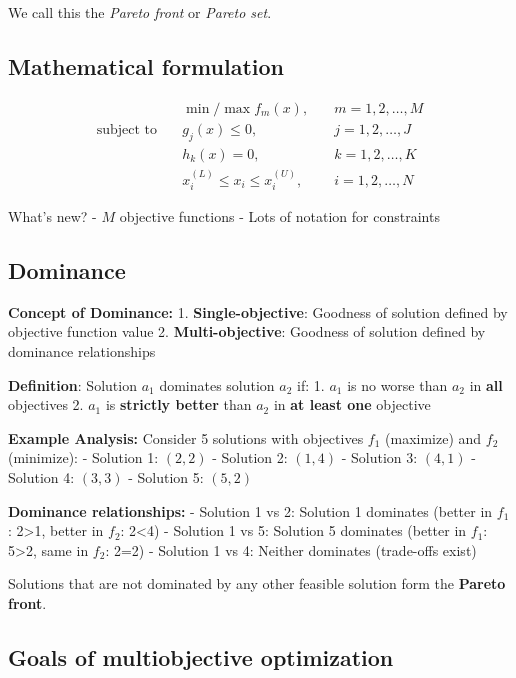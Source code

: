 \documentclass[
  letterpaper,
  DIV=11,
  numbers=noendperiod]{scrreprt}
\begin{document}
We call this the \emph{Pareto front} or \emph{Pareto set}.

\subsection{Mathematical formulation}\label{mathematical-formulation}

\[
\begin{align}
& \min / \max f_m(x), & \quad m = 1, 2, \ldots, M \\
\text{subject to} \quad &g_j(x) \leq 0, &\quad  j = 1, 2, \ldots, J \\
 &h_k(x) = 0, &\quad  k = 1, 2, \ldots, K \\
 &x_i^{(L)} \leq x_i \leq x_i^{(U)}, &\quad  i = 1, 2, \ldots, N
\end{align}
\]

What's new? - \(M\) objective functions - Lots of notation for
constraints

\subsection{Dominance}\label{dominance}

\textbf{Concept of Dominance:} 1. \textbf{Single-objective}: Goodness of
solution defined by objective function value 2.
\textbf{Multi-objective}: Goodness of solution defined by dominance
relationships

\textbf{Definition}: Solution \(a_1\) dominates solution \(a_2\) if: 1.
\(a_1\) is no worse than \(a_2\) in \textbf{all} objectives 2. \(a_1\)
is \textbf{strictly better} than \(a_2\) in \textbf{at least one}
objective

\textbf{Example Analysis:} Consider 5 solutions with objectives \(f_1\)
(maximize) and \(f_2\) (minimize): - Solution 1: \((2, 2)\) - Solution
2: \((1, 4)\) - Solution 3: \((4, 1)\) - Solution 4: \((3, 3)\) -
Solution 5: \((5, 2)\)

\textbf{Dominance relationships:} - Solution 1 vs 2: Solution 1
dominates (better in \(f_1\): 2\textgreater1, better in \(f_2\):
2\textless4) - Solution 1 vs 5: Solution 5 dominates (better in \(f_1\):
5\textgreater2, same in \(f_2\): 2=2) - Solution 1 vs 4: Neither
dominates (trade-offs exist)

Solutions that are not dominated by any other feasible solution form the
\textbf{Pareto front}.

\subsection{Goals of multiobjective
optimization}\label{goals-of-multiobjective-optimization}
\end{document}
